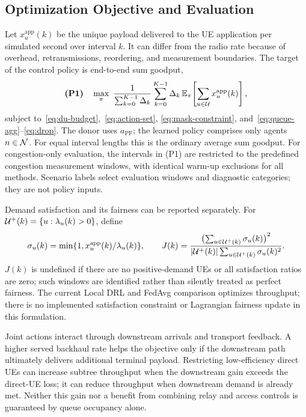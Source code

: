 \begin{EnChapter}
\section{Optimization Objective and Evaluation}
\label{subsec:problem}

Let $x_u^{\mathrm{app}}(k)$ be the unique payload delivered to the UE application
per simulated second over interval $k$. It can differ from the radio rate because
of overhead, retransmissions, reordering, and measurement boundaries. The target
of the control policy is end-to-end sum goodput,
\begin{equation}
  \textbf{(P1)}\quad
  \max_{\pi}\ \frac{1}{\sum_{k=0}^{K-1}\Delta_k}
     \sum_{k=0}^{K-1}\Delta_k\,
         \mathbb{E}_\pi\!\left[\sum_{u\in\mathcal{U}}x_u^{\mathrm{app}}(k)\right],
  \label{eq:P1}
\end{equation}
subject to~\eqref{eq:du-budget},~\eqref{eq:action-set},
\eqref{eq:mask-constraint}, and~\eqref{eq:queue-agg}--\eqref{eq:drop}.
The donor uses $a_{\mathrm{PF}}$; the learned policy comprises only agents
$n\in\mathcal{N}$. For equal interval lengths this is the ordinary average sum goodput.
For congestion-only evaluation, the intervals in (P1) are restricted to the
predefined congestion measurement windows, with identical warm-up exclusions
for all methods. Scenario labels select evaluation windows and diagnostic
categories; they are not policy inputs.

Demand satisfaction and its fairness can be reported separately. For
$\mathcal{U}^+(k)=\{u:\lambda_u(k)>0\}$, define
\begin{equation}
  \sigma_u(k)=\min\{1,x_u^{\mathrm{app}}(k)/\lambda_u(k)\},\qquad
  J(k)=\frac{\bigl(\sum_{u\in\mathcal{U}^+(k)}\sigma_u(k)\bigr)^2}
             {|\mathcal{U}^+(k)|\sum_{u\in\mathcal{U}^+(k)}\sigma_u(k)^2}.
  \label{eq:satisfaction}
\end{equation}
$J(k)$ is undefined if there are no positive-demand UEs or all satisfaction ratios
are zero; such windows are identified rather than silently treated as perfect
fairness. The current Local DRL and FedAvg comparison optimizes throughput;
there is no implemented satisfaction constraint or Lagrangian fairness update
in this formulation.

Joint actions interact through downstream arrivals and transport feedback.
A higher served backhaul rate helps the objective only if the downstream path
ultimately delivers additional terminal payload. Restricting low-efficiency
direct UEs can increase subtree throughput when the downstream gain exceeds the
direct-UE loss; it can reduce throughput when downstream demand is already met.
Neither this gain nor a benefit from combining relay and access controls is
guaranteed by queue occupancy alone.


\end{EnChapter}
